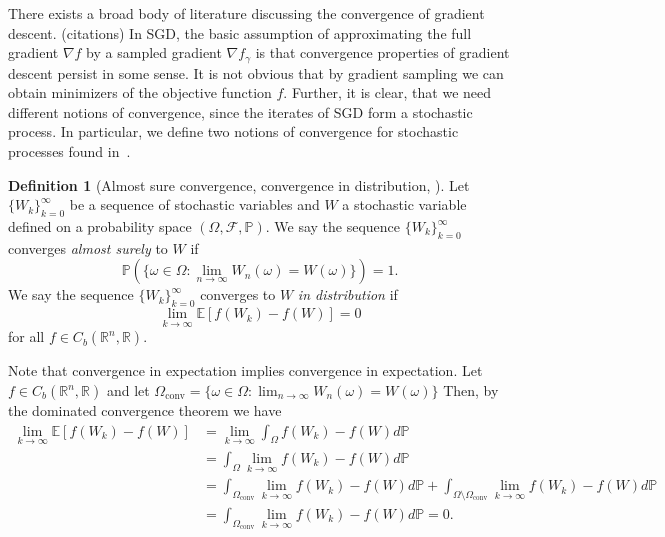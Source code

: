 \documentclass[12pt]{article}
\theoremstyle{definition}
\newtheorem{definition}[definition]{Definition}
\numberwithin{equation}{section}
\newcommand{\R}{\mathbb{R}}
\newcommand{\BP}{\mathbb{P}}
\newcommand{\CF}{\mathcal{F}}
\newcommand{\ev}[1]{\mathbb{E}\left[{#1}\right]}
\begin{document}
There exists a broad body of literature discussing the convergence of gradient descent. (citations) In SGD, the basic assumption of approximating the full gradient $\nabla f$ by a sampled gradient $\nabla f_{\gamma}$ is that convergence properties of gradient descent persist in some sense. It is not obvious that by gradient sampling we can obtain minimizers of the objective function $f$. Further, it is clear, that we need different notions of convergence, since the iterates of SGD form a stochastic process. In particular, we define two notions of convergence for stochastic processes found in~\autocite{eAppliedStochasticAnalysis2021}.
\begin{definition}[Almost sure convergence, convergence in distribution, ]
Let $\{W_k\}_{k=0}^{\infty}$ be a sequence of stochastic variables and $W$ a stochastic variable defined on a probability space $(\Omega, \CF, \BP)$. We say the sequence $\{W_k\}_{k=0}^{\infty}$ converges \emph{almost surely} to $W$ if
\begin{equation}
  \BP(\{\omega \in \Omega : \lim_{n \rightarrow \infty}W_n(\omega) = W(\omega)\}) = 1.
\end{equation}
We say the sequence  $\{W_k\}_{k=0}^{\infty}$ converges to $W$ \emph{in distribution} if
  \begin{equation}
    \lim_{k \rightarrow \infty}\ev{f(W_k) - f(W)} = 0
  \end{equation}
  for all $f \in C_b(\R^n, \R)$.
\end{definition}
Note that convergence in expectation implies convergence in expectation. Let $f \in C_b(\R^n, \R)$ and let $\Omega_{\text{conv}} = \{\omega \in \Omega : \lim_{n \rightarrow \infty}W_n(\omega) = W(\omega)\}$ Then, by the dominated convergence theorem we have 
\begin{align*}
  \lim_{k \rightarrow \infty} \ev{f(W_k) - f(W)} &= \lim_{k \rightarrow \infty}\int_{\Omega} f(W_k) - f(W) d\BP \\
  &= \int_{\Omega} \lim_{k \rightarrow \infty} f(W_k) - f(W) d\BP \\
  &= \int_{\Omega_{\text{conv}}} \lim_{k \rightarrow \infty} f(W_k) - f(W) d\BP
   + \int_{\Omega \setminus \Omega_{\text{conv}}} \lim_{k \rightarrow \infty} f(W_k) - f(W) d\BP \\
  &= \int_{\Omega_{\text{conv}}} \lim_{k \rightarrow \infty} f(W_k) - f(W) d\BP = 0.
\end{align*}
\end{document}
